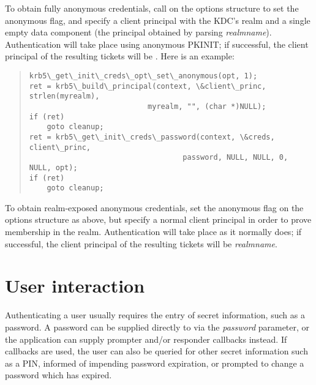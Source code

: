\documentclass[letterpaper,10pt,english]{sphinxmanual}
\begin{document}
To obtain fully anonymous credentials, call
{\hyperref[appdev/refs/api/krb5_get_init_creds_opt_set_anonymous:krb5_get_init_creds_opt_set_anonymous]{}} on the options
structure to set the anonymous flag, and specify a client principal
with the KDC's realm and a single empty data component (the principal
obtained by parsing \emph{realmname}).  Authentication will take
place using anonymous PKINIT; if successful, the client principal of
the resulting tickets will be
.  Here is an example:
\begin{quote}

\begin{Verbatim}[commandchars=\\\{\}]
krb5\_get\_init\_creds\_opt\_set\_anonymous(opt, 1);
ret = krb5\_build\_principal(context, \&client\_princ, strlen(myrealm),
                           myrealm, "", (char *)NULL);
if (ret)
    goto cleanup;
ret = krb5\_get\_init\_creds\_password(context, \&creds, client\_princ,
                                   password, NULL, NULL, 0, NULL, opt);
if (ret)
    goto cleanup;
\end{Verbatim}
\end{quote}

To obtain realm-exposed anonymous credentials, set the anonymous flag
on the options structure as above, but specify a normal client
principal in order to prove membership in the realm.  Authentication
will take place as it normally does; if successful, the client
principal of the resulting tickets will be \emph{realmname}.


\section{User interaction}
\label{appdev/init_creds:user-interaction}
Authenticating a user usually requires the entry of secret
information, such as a password.  A password can be supplied directly
to {\hyperref[appdev/refs/api/krb5_get_init_creds_password:krb5_get_init_creds_password]{}} via the \emph{password}
parameter, or the application can supply prompter and/or responder
callbacks instead.  If callbacks are used, the user can also be
queried for other secret information such as a PIN, informed of
impending password expiration, or prompted to change a password which
has expired.
\end{document}
